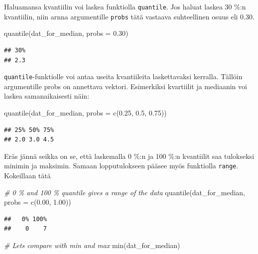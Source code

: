 \documentclass[
]{book}
\newenvironment{Shaded}{\begin{snugshade}}{\end{snugshade}}
\newcommand{\AttributeTok}[1]{\textcolor[rgb]{0.77,0.63,0.00}{#1}}
\newcommand{\CommentTok}[1]{\textcolor[rgb]{0.56,0.35,0.01}{\textit{#1}}}
\newcommand{\FloatTok}[1]{\textcolor[rgb]{0.00,0.00,0.81}{#1}}
\newcommand{\FunctionTok}[1]{\textcolor[rgb]{0.00,0.00,0.00}{#1}}
\newcommand{\NormalTok}[1]{#1}
\begin{document}
Haluamansa kvantiilin voi laskea funktiolla \texttt{quantile}. Jos haluat laskea 30 \%:n kvantiilin, niin arnna argumentille \texttt{probs} tätä vastaava suhteellinen osuus eli 0.30.

\begin{Shaded}
\begin{Highlighting}[]
\FunctionTok{quantile}\NormalTok{(dat\_for\_median, }\AttributeTok{probs =} \FloatTok{0.30}\NormalTok{)}
\end{Highlighting}
\end{Shaded}

\begin{verbatim}
## 30% 
## 2.3
\end{verbatim}

\texttt{quantile}-funktiolle voi antaa useita kvantiileita laskettavaksi kerralla. Tällöin argumentille probs on annettava vektori. Esimerkiksi kvartiilit ja mediaanin voi laskea samanaikaisesti näin:

\begin{Shaded}
\begin{Highlighting}[]
\FunctionTok{quantile}\NormalTok{(dat\_for\_median, }\AttributeTok{probs =} \FunctionTok{c}\NormalTok{(}\FloatTok{0.25}\NormalTok{, }\FloatTok{0.5}\NormalTok{, }\FloatTok{0.75}\NormalTok{))}
\end{Highlighting}
\end{Shaded}

\begin{verbatim}
## 25% 50% 75% 
## 2.0 3.0 4.5
\end{verbatim}

Eräs jännä seikka on se, että laskemalla 0 \%:n ja 100 \%:n kvantiilit saa tulokseksi minimin ja maksimin. Samaan lopputulokseen pääsee myös funktiolla \texttt{range}. Kokeillaan tätä

\begin{Shaded}
\begin{Highlighting}[]
\CommentTok{\# 0 \% and 100 \% quantile gives a range of the data}
\FunctionTok{quantile}\NormalTok{(dat\_for\_median, }\AttributeTok{probs =} \FunctionTok{c}\NormalTok{(}\FloatTok{0.00}\NormalTok{, }\FloatTok{1.00}\NormalTok{))}
\end{Highlighting}
\end{Shaded}

\begin{verbatim}
##   0% 100% 
##    0    7
\end{verbatim}

\begin{Shaded}
\begin{Highlighting}[]
\CommentTok{\# Let\textquotesingle{}s compare with min and max}
\FunctionTok{min}\NormalTok{(dat\_for\_median)}
\end{Highlighting}
\end{Shaded}
\end{document}
